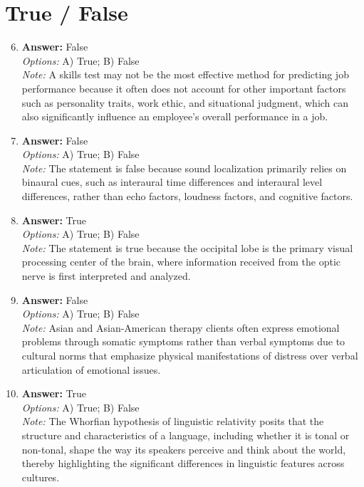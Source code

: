 \documentclass[12pt]{article}
\begin{document}
\section*{True / False}
\begin{enumerate}[label=\arabic*.]
\setcounter{enumi}{5}
\item \textbf{Answer:} False
\\ \textit{Options:} A) True; B) False
\\ \textit{Note:} A skills test may not be the most effective method for predicting job performance because it often does not account for other important factors such as personality traits, work ethic, and situational judgment, which can also significantly influence an employee's overall performance in a job.
\item \textbf{Answer:} False
\\ \textit{Options:} A) True; B) False
\\ \textit{Note:} The statement is false because sound localization primarily relies on binaural cues, such as interaural time differences and interaural level differences, rather than echo factors, loudness factors, and cognitive factors.
\item \textbf{Answer:} True
\\ \textit{Options:} A) True; B) False
\\ \textit{Note:} The statement is true because the occipital lobe is the primary visual processing center of the brain, where information received from the optic nerve is first interpreted and analyzed.
\item \textbf{Answer:} False
\\ \textit{Options:} A) True; B) False
\\ \textit{Note:} Asian and Asian-American therapy clients often express emotional problems through somatic symptoms rather than verbal symptoms due to cultural norms that emphasize physical manifestations of distress over verbal articulation of emotional issues.
\item \textbf{Answer:} True
\\ \textit{Options:} A) True; B) False
\\ \textit{Note:} The Whorfian hypothesis of linguistic relativity posits that the structure and characteristics of a language, including whether it is tonal or non-tonal, shape the way its speakers perceive and think about the world, thereby highlighting the significant differences in linguistic features across cultures.
\end{enumerate}
\end{document}

